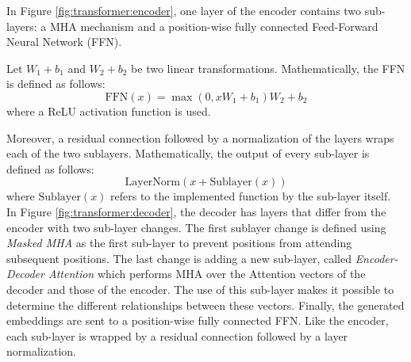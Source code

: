 In Figure \ref{fig:transformer:encoder}, one layer of the encoder contains two
sub-layers: a MHA mechanism and a position-wise fully connected Feed-Forward
Neural Network (FFN).
\begin{definition}
  Let $W_1 + b_1$ and $W_2 + b_2$ be two linear transformations. Mathematically,
  the FFN is defined as follows:
  \begin{equation}
    \mathrm{FFN}(x) = \max\left(0, xW_1 + b_1\right)W_2 + b_2
    \label{eq:def:ffn}
  \end{equation}
  where a ReLU activation function is used.
  \label{def:ffn}
\end{definition}

Moreover, a residual connection followed by a normalization of the layers wraps
each of the two sublayers. Mathematically, the output of every sub-layer is
defined as follows:
\begin{equation}
  \mathrm{LayerNorm}(x + \mathrm{Sublayer}(x))
  \label{eq:output:sub-layer}
\end{equation}
where $\mathrm{Sublayer}(x)$ refers to the implemented function by the sub-layer
itself. \\


\noindent In Figure \ref{fig:transformer:decoder}, the decoder has layers that
differ from the encoder with two sub-layer changes. The first sublayer change is
defined using \emph{Masked MHA} as the first sub-layer to prevent positions from
attending subsequent positions. The last change is adding a new sub-layer,
called \emph{Encoder-Decoder Attention} which performs MHA over the Attention
vectors of the decoder and those of the encoder. The use of this sub-layer makes
it possible to determine the different relationships between these
vectors. Finally, the generated embeddings are sent to a position-wise fully
connected FFN. Like the encoder, each sub-layer is wrapped by a residual
connection followed by a layer normalization.

